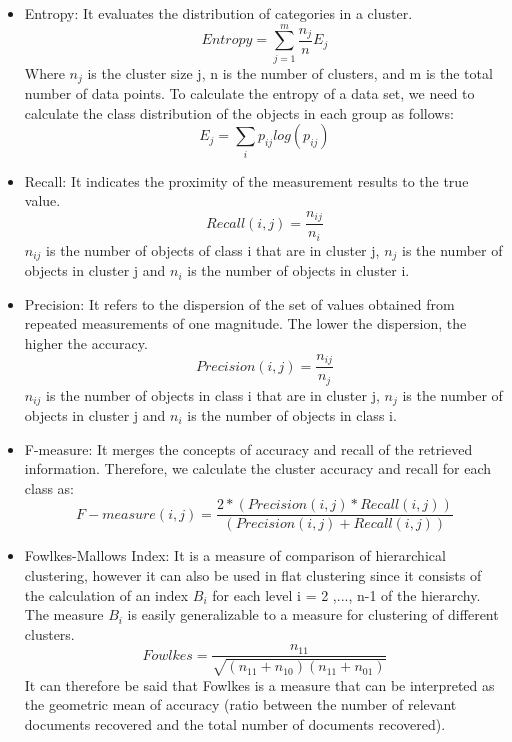 \begin{itemize}
    \item Entropy: \citep{b40} It evaluates the distribution of categories in a cluster.
    \begin{equation}
        Entropy =  \sum_{j=1}^{m} \frac{n_{j}}{n}E_{j}
    \end{equation}
    Where $n_{j}$ is the cluster size j, n is the number of clusters, and m is the total number of data points. To calculate the entropy of a data set, we need to calculate the class distribution of the objects in each group as follows:
    \begin{equation}
        E_{j} =  \sum_{i} p_{ij}log(p_{ij})
    \end{equation}

    \item Recall: \cite{b41} It indicates the proximity of the measurement results to the true value.
    \begin{equation}
         Recall(i,j) = \frac{n_{ij}}{n_{i}}
    \end{equation}
    $n_{ij}$ is the number of objects of class i that are in cluster j, $n_{j}$ is the number of objects in cluster j and $n_{i}$ is the number of objects in cluster i.
    \item Precision: \cite{b41} It refers to the dispersion of the set of values obtained from repeated measurements of one magnitude. The lower the dispersion, the higher the accuracy.
        \begin{equation}
            Precision(i,j) = \frac{n_{ij}}{n_{j}}
        \end{equation}
     $n_{ij}$ is the number of objects in class i that are in cluster j, $n_{j}$ is the number of objects in cluster j and $n_{i}$ is the number of objects in class i.
    \item F-measure: \cite{b42} It merges the concepts of accuracy and recall of the retrieved information. Therefore, we calculate the cluster accuracy and recall for each class as:
    \begin{equation}
        F-measure(i,j) = \frac{2 * (Precision(i,j) * Recall(i,j))}{(Precision(i,j) + Recall(i,j))}
    \end{equation}
    \item Fowlkes-Mallows Index: \cite{b43} It is a measure of comparison of hierarchical clustering, however it can also be used in flat clustering since it consists of the calculation of an index $B_{i}$ for each level i = 2 ,..., n-1 of the hierarchy. The measure $B_{i}$ is easily generalizable to a measure for clustering of different clusters.
    \begin{equation}
        Fowlkes = \frac{n_{11}}{\sqrt{(n_{11}+n_{10})(n_{11}+n_{01})}}
    \end{equation}
    It can therefore be said that Fowlkes is a measure that can be interpreted as the geometric mean of accuracy (ratio between the number of relevant documents recovered and the total number of documents recovered).



\end{itemize}

